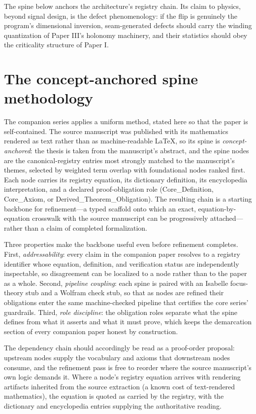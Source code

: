 \documentclass[11pt]{article}
\theoremstyle{remark}
\begin{document}
The spine below anchors the architecture's registry chain. Its claim to physics, beyond signal design, is the defect phenomenology: if the flip is genuinely the program's dimensional inversion, seam-generated defects should carry the winding quantization of Paper III's holonomy machinery, and their statistics should obey the criticality structure of Paper I.

\section{The concept-anchored spine methodology}
\label{sec:method}

The companion series applies a uniform method, stated here so that the paper is self-contained. The source manuscript was published with its mathematics rendered as text rather than as machine-readable LaTeX, so its spine is \emph{concept-anchored}: the thesis is taken from the manuscript's abstract, and the spine nodes are the canonical-registry entries most strongly matched to the manuscript's themes, selected by weighted term overlap with foundational nodes ranked first. Each node carries its registry equation, its dictionary definition, its encyclopedia interpretation, and a declared proof-obligation role (Core\_Definition, Core\_Axiom, or Derived\_Theorem\_Obligation). The resulting chain is a starting backbone for refinement---a typed scaffold onto which an exact, equation-by-equation crosswalk with the source manuscript can be progressively attached---rather than a claim of completed formalization.

Three properties make the backbone useful even before refinement completes. First, \emph{addressability}: every claim in the companion paper resolves to a registry identifier whose equation, definition, and verification status are independently inspectable, so disagreement can be localized to a node rather than to the paper as a whole. Second, \emph{pipeline coupling}: each spine is paired with an Isabelle focus-theory stub and a Wolfram check stub, so that as nodes are refined their obligations enter the same machine-checked pipeline that certifies the core series' guardrails. Third, \emph{role discipline}: the obligation roles separate what the spine defines from what it asserts and what it must prove, which keeps the demarcation section of every companion paper honest by construction.

The dependency chain should accordingly be read as a proof-order proposal: upstream nodes supply the vocabulary and axioms that downstream nodes consume, and the refinement pass is free to reorder where the source manuscript's own logic demands it. Where a node's registry equation arrives with rendering artifacts inherited from the source extraction (a known cost of text-rendered mathematics), the equation is quoted as carried by the registry, with the dictionary and encyclopedia entries supplying the authoritative reading.
\end{document}
